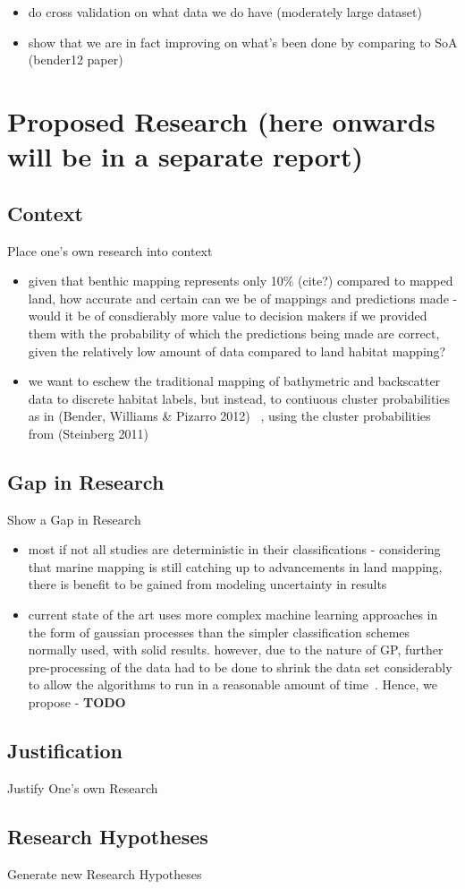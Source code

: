 \documentclass[12pt]{article}
\begin{document}
\begin{itemize}
    \item do cross validation on what data we do have (moderately large dataset)
    \item show that we are in fact improving on what's been done by comparing to SoA (bender12 paper)
\end{itemize}        


\section{Proposed Research (here onwards will be in a separate report)}
\subsection{Context}
Place one's own research into context
\begin{itemize}
\item given that benthic mapping represents only 10\% (cite?) compared to mapped land, how accurate and certain can we be of mappings and predictions made - would it be of consdierably more value to decision makers if we provided them with the probability of which the predictions being made are correct, given the relatively low amount of data compared to land habitat mapping?
\item we want to eschew the traditional mapping of bathymetric and backscatter data to discrete habitat labels, but instead, to contiuous cluster probabilities as in (Bender, Williams \& Pizarro 2012) ~\citep{bender12}, using the cluster probabilities from (Steinberg 2011) ~\citep{steinberg11}
\end{itemize}

\subsection{Gap in Research}
Show a Gap in Research
\begin{itemize}
\item most if not all studies are deterministic in their classifications - considering that marine mapping is still catching up to advancements in land mapping, there is benefit to be gained from modeling uncertainty in results
\item current state of the art uses more complex machine learning approaches in the form of gaussian processes than the simpler classification schemes normally used, with solid results. however, due to the nature of GP, further pre-processing of the data had to be done to shrink the data set considerably to allow the algorithms to run in a reasonable amount of time~\citep{bender12}. Hence, we propose - \textbf{TODO}
\end{itemize}

\subsection{Justification}
Justify One's own Research

\subsection{Research Hypotheses}
Generate new Research Hypotheses



\end{document}
